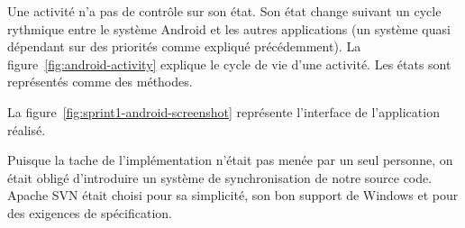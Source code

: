 Une activité n'a pas de contrôle sur son état. Son état change suivant un cycle
rythmique entre le système Android et les autres applications (un système quasi
dépendant sur des priorités comme expliqué précédemment). La
figure~\ref{fig:android-activity} explique le cycle de vie d'une activité. Les
états sont représentés comme des méthodes.



%

La figure~\ref{fig:sprint1-android-screenshot} représente l'interface de
l'application réalisé.

Puisque la tache de l'implémentation n'était pas menée par un seul personne, on
était obligé d'introduire un système de synchronisation de notre source code.
Apache SVN était choisi pour sa simplicité, son bon support de Windows et pour
des exigences de spécification.

